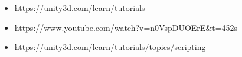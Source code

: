 \documentclass[12pt, a4paper]{article}
\begin{document}


\newpage
{}

\newpage

\newpage

\newpage

\newpage

\newpage

\newpage

\newpage

\newpage

\newpage


%

\begin{itemize}
	\item https://unity3d.com/learn/tutorials
	
	\item https://www.youtube.com/watch?v=n0VspDUOErE&t=452s
	
	\item https://unity3d.com/learn/tutorials/topics/scripting
	
\end{itemize}
\end{document}
